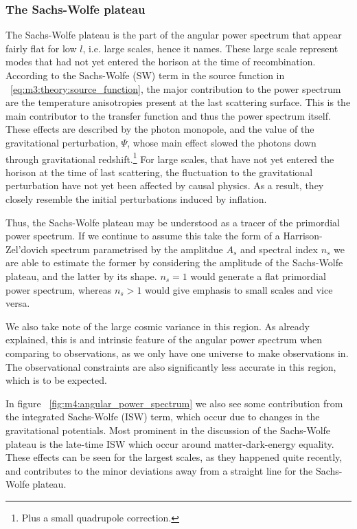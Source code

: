     \subsubsection{The Sachs-Wolfe plateau}
        The Sachs-Wolfe plateau is the part of the angular power spectrum that appear fairly flat for low $l$, i.e. large scales, hence it names. These large scale represent modes that had not yet entered the horison at the time of recombination. According to the Sachs-Wolfe (SW) term in the source function in ~\cref{eq:m3:theory:source_function}, the major contribution to the power spectrum are the temperature anisotropies present at the last scattering surface. This is the main contributor to the transfer function and thus the power spectrum itself. These effects are described by the photon monopole, and the value of the gravitational perturbation, $\Psi$, whose main effect slowed the photons down through gravitational redshift.\footnote{Plus a small quadrupole correction.} For large scales, that have not yet entered the horison at the time of last scattering, the fluctuation to the gravitational perturbation have not yet been affected by causal physics. As a result, they closely resemble the initial perturbations induced by inflation. 

        Thus, the Sachs-Wolfe plateau may be understood as a tracer of the primordial power spectrum. If we continue to assume this take the form of a Harrison-Zel'dovich spectrum parametrised by the amplitdue $A_s$ and spectral index $n_s$ we are able to estimate the former by considering the amplitude of the Sachs-Wolfe plateau, and the latter by its shape. $n_s=1$ would generate a flat primordial power spectrum, whereas $n_s>1$ would give emphasis to small scales and vice versa. 

        We also take note of the large cosmic variance in this region. As already explained, this is and intrinsic feature of the angular power spectrum when comparing to observations, as we only have one universe to make observations in. The observational constraints are also significantly less accurate in this region, which is to be expected. 
        
        In figure ~\cref{fig:m4:angular_power_spectrum} we also see some contribution from the integrated Sachs-Wolfe (ISW) term, which occur due to changes in the gravitational potentials. Most prominent in the discussion of the Sachs-Wolfe plateau is the late-time ISW which occur around matter-dark-energy equality. These effects can be seen for the largest scales, as they happened quite recently, and contributes to the minor deviations away from a straight line for the Sachs-Wolfe plateau.
        
